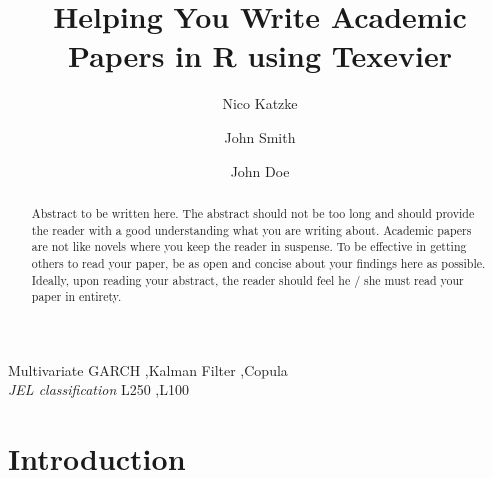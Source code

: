 \documentclass[11pt,preprint, authoryear]{elsarticle}
\numberwithin{equation}{section}
\numberwithin{figure}{section}
\numberwithin{table}{section}
\begin{document}
\begin{frontmatter}  %

\title{Helping You Write Academic Papers in R using Texevier}

\author[Add1]{Nico Katzke}

\author[Add1,Add2]{John Smith}

\author[Add1,Add2]{John Doe}



\address[Add1]{Prescient Securities, Cape Town, South Africa}
\address[Add2]{Some other Institution, Cape Town, South Africa}


\begin{abstract}
\small{
Abstract to be written here. The abstract should not be too long and
should provide the reader with a good understanding what you are writing
about. Academic papers are not like novels where you keep the reader in
suspense. To be effective in getting others to read your paper, be as
open and concise about your findings here as possible. Ideally, upon
reading your abstract, the reader should feel he / she must read your
paper in entirety.
}
\end{abstract}

\vspace{1cm}

\begin{keyword}
\footnotesize{
Multivariate GARCH \sep Kalman Filter \sep Copula \\ \vspace{0.3cm}
\textit{JEL classification} L250 \sep L100
}
\end{keyword}
\vspace{0.5cm}
\end{frontmatter}



\pagestyle{fancy}
\chead{}
\rhead{}
\lfoot{}
\lhead{}
\cfoot{}


\headsep 35pt %




\section{\texorpdfstring{Introduction
\label{Introduction}}{Introduction }}\label{introduction}
\end{document}
